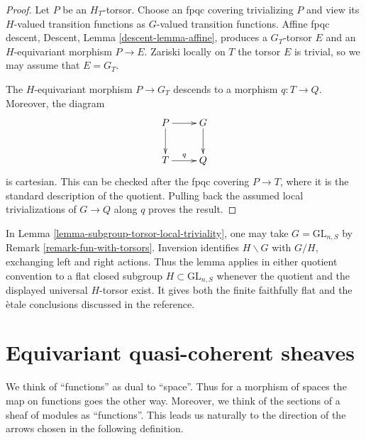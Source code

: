 \begin{proof}
Let $P$ be an $H_T$-torsor. Choose an fpqc covering trivializing $P$ and
view its $H$-valued transition functions as $G$-valued transition
functions. Affine fpqc descent, Descent, Lemma
\ref{descent-lemma-affine}, produces a $G_T$-torsor $E$ and an
$H$-equivariant morphism $P \to E$. Zariski locally on $T$ the torsor
$E$ is trivial, so we may assume that $E = G_T$.

The $H$-equivariant morphism $P \to G_T$ descends to a morphism
$q : T \to Q$. Moreover, the diagram
$$
\xymatrix{
P \ar[r] \ar[d] & G \ar[d] \\
T \ar[r]^q & Q
}
$$
is cartesian. This can be checked after the fpqc covering $P \to T$,
where it is the standard description of the quotient. Pulling back the
assumed local trivializations of $G \to Q$ along $q$ proves the result.
\end{proof}

\begin{remark}
\label{remark-linear-subgroup-torsors}
In Lemma \ref{lemma-subgroup-torsor-local-triviality}, one may take
$G = \text{GL}_{n, S}$ by Remark \ref{remark-fun-with-torsors}.
Inversion identifies $H \backslash G$ with $G/H$, exchanging left and
right actions. Thus the lemma applies in either quotient convention to a
flat closed subgroup $H \subset \text{GL}_{n, S}$ whenever the quotient
and the displayed universal $H$-torsor exist. It gives both the finite
faithfully flat and the \`etale conclusions discussed in the reference.
\end{remark}



\section{Equivariant quasi-coherent sheaves}
\label{section-equivariant}

\noindent
We think of ``functions'' as dual to ``space''. Thus for a morphism of spaces
the map on functions goes the other way. Moreover, we think of the
sections of a sheaf of modules as ``functions''. This leads us naturally
to the direction of the arrows chosen in the following definition.

